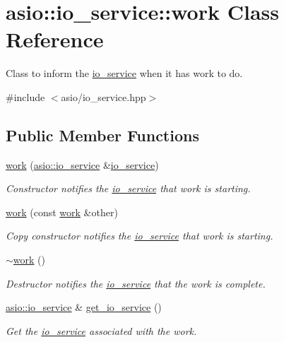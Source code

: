 \hypertarget{classasio_1_1io__service_1_1work}{}\section{asio\+:\+:io\+\_\+service\+:\+:work Class Reference}
\label{classasio_1_1io__service_1_1work}


Class to inform the \hyperlink{classasio_1_1io__service}{io\+\_\+service} when it has work to do.  




{\ttfamily \#include $<$asio/io\+\_\+service.\+hpp$>$}

\subsection*{Public Member Functions}
\begin{DoxyCompactItemize}
\item 
\hyperlink{classasio_1_1io__service_1_1work_a6f49aeea63cbba270f16f71229958b6b}{work} (\hyperlink{classasio_1_1io__service}{asio\+::io\+\_\+service} \&\hyperlink{classasio_1_1io__service}{io\+\_\+service})
\begin{DoxyCompactList}\small\item\em Constructor notifies the \hyperlink{classasio_1_1io__service}{io\+\_\+service} that work is starting. \end{DoxyCompactList}\item 
\hyperlink{classasio_1_1io__service_1_1work_aa2e88368613626e0bbfa8df0fa002bb2}{work} (const \hyperlink{classasio_1_1io__service_1_1work}{work} \&other)
\begin{DoxyCompactList}\small\item\em Copy constructor notifies the \hyperlink{classasio_1_1io__service}{io\+\_\+service} that work is starting. \end{DoxyCompactList}\item 
\hyperlink{classasio_1_1io__service_1_1work_aa2f10ca46883519c66c50973ffabbe49}{$\sim$work} ()
\begin{DoxyCompactList}\small\item\em Destructor notifies the \hyperlink{classasio_1_1io__service}{io\+\_\+service} that the work is complete. \end{DoxyCompactList}\item 
\hyperlink{classasio_1_1io__service}{asio\+::io\+\_\+service} \& \hyperlink{classasio_1_1io__service_1_1work_a2f8c17cdaa95e5bf43002d37b1d6eb90}{get\+\_\+io\+\_\+service} ()
\begin{DoxyCompactList}\small\item\em Get the \hyperlink{classasio_1_1io__service}{io\+\_\+service} associated with the work. \end{DoxyCompactList}\end{DoxyCompactItemize}



